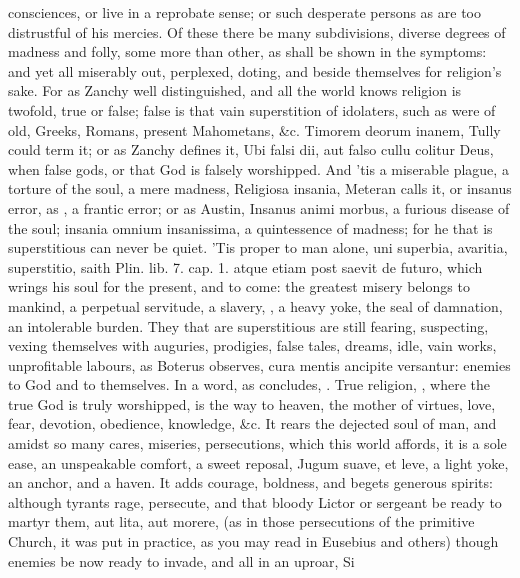 {consciences, or live in a reprobate sense; or such desperate persons as
are too distrustful of his mercies. Of these there be many
subdivisions, diverse degrees of madness and folly, some more than
other, as shall be shown in the symptoms: and yet all miserably out,
perplexed, doting, and beside themselves for religion's sake. For as
Zanchy well distinguished, and all the world knows religion is
twofold, true or false; false is that vain superstition of idolaters,
such as were of old, Greeks, Romans, present Mahometans, \&c. Timorem
deorum inanem, Tully could term it; or as Zanchy defines it, Ubi
falsi dii, aut falso cullu colitur Deus, when false gods, or that God
is falsely worshipped. And 'tis a miserable plague, a torture of the
soul, a mere madness, Religiosa insania, Meteran calls it, or
insanus error, as \Seneca, a frantic error; or as Austin, Insanus
animi morbus, a furious disease of the soul; insania omnium
insanissima, a quintessence of madness; for he that is
superstitious can never be quiet. 'Tis proper to man alone, uni
superbia, avaritia, superstitio, saith Plin. lib. 7. cap. 1. atque
etiam post saevit de futuro, which wrings his soul for the present, and
to come: the greatest misery belongs to mankind, a perpetual servitude,
a slavery, , a heavy yoke, the seal of damnation,
an intolerable burden. They that are superstitious are still fearing,
suspecting, vexing themselves with auguries, prodigies, false tales,
dreams, idle, vain works, unprofitable labours, as Boterus
observes, cura mentis ancipite versantur: enemies to God and to
themselves. In a word, as \Seneca concludes, . True religion, , where the true God is
truly worshipped, is the way to heaven, the mother of virtues, love,
fear, devotion, obedience, knowledge, \&c. It rears the dejected soul of
man, and amidst so many cares, miseries, persecutions, which this world
affords, it is a sole ease, an unspeakable comfort, a sweet reposal,
Jugum suave, et leve, a light yoke, an anchor, and a haven. It adds
courage, boldness, and begets generous spirits: although tyrants rage,
persecute, and that bloody Lictor or sergeant be ready to martyr them,
aut lita, aut morere, (as in those persecutions of the primitive
Church, it was put in practice, as you may read in Eusebius and others)
though enemies be now ready to invade, and all in an uproar, Si
}
